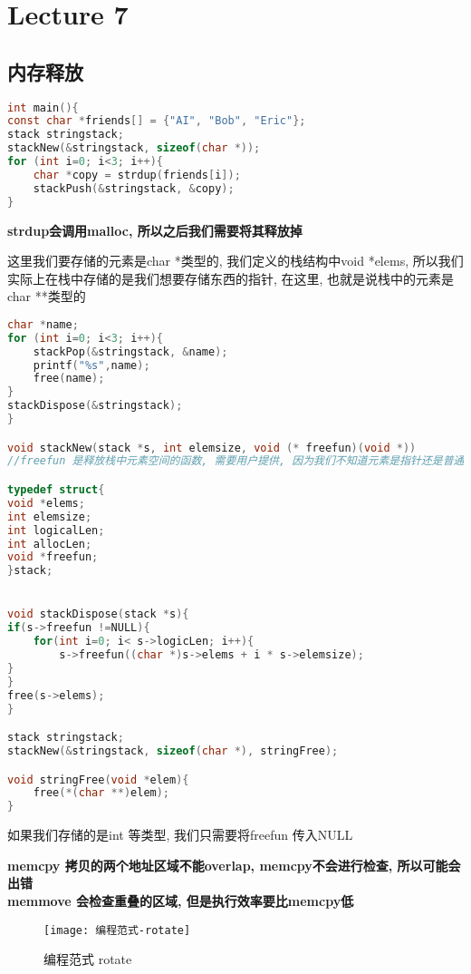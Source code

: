 \documentclass{article}
\begin{document}
\section{Lecture 7}
\subsection{内存释放}
\begin{lstlisting}[language = C]
int main(){
const char *friends[] = {"AI", "Bob", "Eric"};
stack stringstack;
stackNew(&stringstack, sizeof(char *));
for (int i=0; i<3; i++){
	char *copy = strdup(friends[i]);
	stackPush(&stringstack, &copy);
}
\end{lstlisting}
\textbf{strdup会调用malloc, 所以之后我们需要将其释放掉}

这里我们要存储的元素是char *类型的, 我们定义的栈结构中void *elems, 所以我们实际上在栈中存储的是我们想要存储东西的指针, 在这里, 也就是说栈中的元素是char **类型的

\begin{lstlisting}[language = C]
char *name;
for (int i=0; i<3; i++){
	stackPop(&stringstack, &name);
	printf("%s",name);
	free(name);
}
stackDispose(&stringstack);
}

void stackNew(stack *s, int elemsize, void (* freefun)(void *))
//freefun 是释放栈中元素空间的函数, 需要用户提供, 因为我们不知道元素是指针还是普通元素

typedef struct{
void *elems;
int elemsize;
int logicalLen;
int allocLen;
void *freefun;
}stack;


void stackDispose(stack *s){
if(s->freefun !=NULL){
	for(int i=0; i< s->logicLen; i++){
		s->freefun((char *)s->elems + i * s->elemsize);
}
}
free(s->elems);
}

stack stringstack;
stackNew(&stringstack, sizeof(char *), stringFree);

void stringFree(void *elem){
	free(*(char **)elem);
}
\end{lstlisting}
如果我们存储的是int 等类型, 我们只需要将freefun 传入NULL

\bigskip\noindent
\textbf{memcpy 拷贝的两个地址区域不能overlap, memcpy不会进行检查, 所以可能会出错\\
memmove 会检查重叠的区域, 但是执行效率要比memcpy低}

\begin{figure}[htbp]
	\centering
	\texttt{[image: 编程范式-rotate]}\\
	\caption{编程范式 rotate}\label{fig.编程范式.rotate}
\end{figure}
\end{document}
